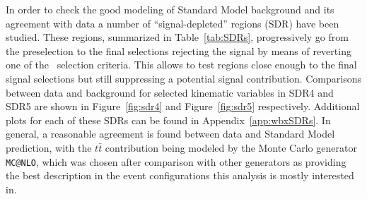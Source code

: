 In order to check the good modeling of Standard Model background
and its agreement with data a number of ``signal-depleted'' regions (SDR) 
have been studied. These regions, summarized in Table~\ref{tab:SDRs},
progressively go from the preselection to the final selections 
rejecting the signal by means of reverting one of the \tight\ selection criteria.
This allows to test regions close enough to the final signal selections
but still suppressing a potential signal contribution.
Comparisons between data and background for 
selected kinematic variables in SDR4 and SDR5
are shown in Figure~\ref{fig:sdr4} and Figure~\ref{fig:sdr5} respectively.
Additional plots for each of these SDRs can be found in 
Appendix~\ref{app:wbxSDRs}.
In general, a reasonable agreement is found between data and Standard Model
prediction, with the $t\bar{t}$ contribution being modeled by the Monte Carlo 
generator \texttt{MC@NLO}, which was chosen after comparison with other
generators as providing the best description in the event configurations
this analysis is mostly interested in.

